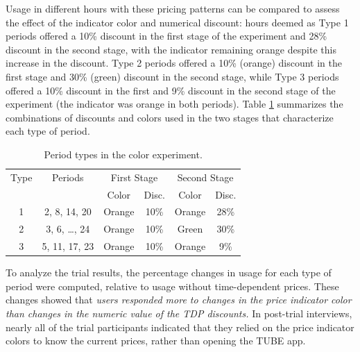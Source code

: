 Usage in different hours with these pricing patterns can be compared to assess the effect of the indicator color and numerical discount: hours deemed as Type 1 periods offered a 10\% discount in the first stage of the experiment and 28\% discount in the second stage, with the indicator remaining orange despite this increase in the discount.  Type 2 periods offered a 10\% (orange) discount in the first stage and 30\% (green) discount in the second stage, while Type 3 periods offered a 10\% discount in the first and 9\% discount in the second stage of the experiment (the indicator was orange in both periods).  Table \ref{periodtypes} summarizes the combinations of discounts and colors used in the two stages that characterize each type of period.
\begin{table}
\renewcommand{\arraystretch}{1.1}
\centering
\caption{Period types in the color experiment.}
\vspace{-0.1in}
\begin{tabular}{|c|c|cc|cc|}
\hline
Type & Periods & \multicolumn{2}{c|}{First Stage} & \multicolumn{2}{c|}{Second Stage} \\
 & & Color & Disc. & Color & Disc. \\ \hline
1 & 2, 8, 14, 20 & Orange & 10\% & Orange & 28\% \\ \hline
2 & 3, 6, \ldots, 24 & Orange & 10\% & Green & 30\% \\ \hline
3 & 5, 11, 17, 23 & Orange & 10\% & Orange & 9\% \\ \hline
\end{tabular}
\label{periodtypes}
\end{table}

To analyze the trial results, the percentage changes in usage for each type of period were computed, relative to usage without time-dependent prices. These changes showed that \emph{users responded more to changes in the price indicator color than changes in the numeric value of the TDP discounts.} In post-trial interviews, nearly all of the trial participants indicated that they relied on the price indicator colors to know the current prices, rather than opening the TUBE app.


